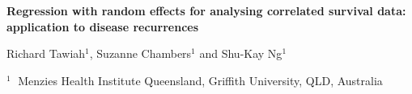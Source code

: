 \documentclass[12pt]{article}
\begin{document}
\begin{flushleft}


{\LARGE\bf Regression with random effects for analysing correlated survival data: application to disease recurrences}

\vspace{0.5cm}

Richard Tawiah$^1$, Suzanne Chambers$^1$ and Shu-Kay Ng$^1$

\begin{description}

\item $^1 \;$ Menzies Health Institute Queensland, Griffith University, QLD, Australia


\end{description}

\end{flushleft}


\vspace{0.15cm}
\end{document}
